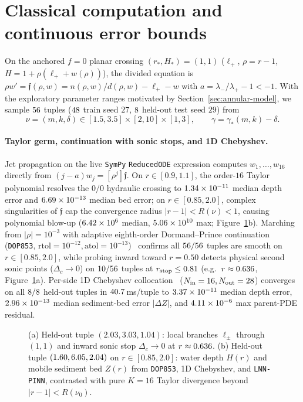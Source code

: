 \documentclass[12pt,a4paper,oneside]{report}
\numberwithin{equation}{chapter}
\theoremstyle{definition}
\theoremstyle{remark}\newtheorem{remark}[theorem]{Remark}
\DeclareRobustCommand{\code}[1]{\nolinkurl{#1}}
\begin{document}
\section{Classical computation and continuous error bounds}\label{sec:classical}

On the anchored $f=0$ planar crossing $(r_*,H_*)=(1,1)$ ($\ell_+$, $\rho=r-1$, $H=1+\rho(\ell_++w(\rho))$), the divided equation is $\rho w'=\mathfrak f(\rho,w)=n(\rho,w)/d(\rho,w)-\ell_+-w$ with $a=\lambda_-/\lambda_+-1<-1$. With the exploratory parameter ranges motivated by Section~\ref{sec:annular-model}, we sample $56$ tuples ($48$ train seed $27$, $8$ held-out test seed $29$) from
\[
 \nu=(m,k,\delta)\in[1.5,3.5]\times[2,10]\times[1,3],\qquad \gamma=\gamma_*(m,k)-\delta.
\]

\paragraph{Taylor germ, continuation with sonic stops, and 1D Chebyshev.}
Jet propagation on the live \texttt{SymPy} \texttt{ReducedODE} expression computes $w_1,\ldots,w_{16}$ directly from $(j-a)w_j=[\rho^j]\mathfrak f$. On $r\in[0.9,1.1]$, the order-$16$ Taylor polynomial resolves the $0/0$ hydraulic crossing to $1.34\times 10^{-11}$ median depth error and $6.69\times 10^{-13}$ median bed error; on $r\in[0.85,2.0]$, complex singularities of $\mathfrak f$ cap the convergence radius $|r-1|<R(\nu)<1$, causing polynomial blow-up ($6.42\times 10^{6}$ median, $5.06\times 10^{10}$ max; Figure~\ref{fig:annulus-solvers}b). Marching from $|\rho|=10^{-3}$ with adaptive eighth-order Dormand--Prince continuation (\code{DOP853}, $\mathrm{rtol}=10^{-12},\mathrm{atol}=10^{-13}$)~\cite{hairer1993,teschl2012} confirms all $56/56$ tuples are smooth on $r\in[0.85,2.0]$, while probing inward toward $r=0.50$ detects physical second sonic points ($\Delta_c\to0$) on $10/56$ tuples at $r_{\rm stop}\le0.81$ (e.g.\ $r\approx0.636$, Figure~\ref{fig:annulus-solvers}a). Per-side 1D Chebyshev collocation~\cite{trefethen} ($N_{\rm in}=16,N_{\rm out}=28$) converges on all $8/8$ held-out tuples in $40.7$\,ms/tuple to $3.37\times 10^{-11}$ median depth error, $2.96\times 10^{-13}$ median sediment-bed error $|\Delta Z|$, and $4.11\times 10^{-6}$ max parent-PDE residual.

\begin{figure}[!ht]\centering

\caption[Saddle crossing, sonic stop, and reconstructed water/sediment profiles]{(a) Held-out tuple $(2.03,3.03,1.04)$: local branches $\ell_\pm$ through $(1,1)$ and inward sonic stop $\Delta_c\to0$ at $r\approx0.636$. (b) Held-out tuple $(1.60,6.05,2.04)$ on $r\in[0.85,2.0]$: water depth $H(r)$ and mobile sediment bed $Z(r)$ from \code{DOP853}, 1D Chebyshev, and \texttt{LNN-PINN}, contrasted with pure $K=16$ Taylor divergence beyond $|r-1|<R(\nu_0)$.}
\label{fig:annulus-solvers}
\end{figure}
\end{document}
